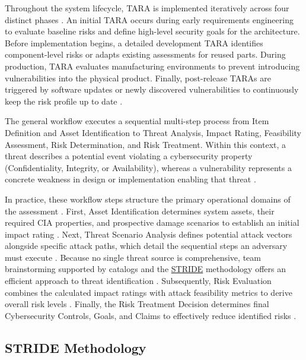 Throughout the system lifecycle, TARA is implemented iteratively across four distinct phases \cite[p. 40]{doCarmo2025}. An initial TARA occurs during early requirements engineering to evaluate baseline risks and define high-level security goals for the architecture. Before implementation begins, a detailed development TARA identifies component-level risks or adapts existing assessments for reused parts. During production, TARA evaluates manufacturing environments to prevent introducing vulnerabilities into the physical product. Finally, post-release TARAs are triggered by software updates or newly discovered vulnerabilities to continuously keep the risk profile up to date \cite[p. 40]{doCarmo2025}.

The general workflow executes a sequential multi-step process from Item Definition and Asset Identification to Threat Analysis, Impact Rating, Feasibility Assessment, Risk Determination, and Risk Treatment. Within this context, a threat describes a potential event violating a cybersecurity property (Confidentiality, Integrity, or Availability), whereas a vulnerability represents a concrete weakness in design or implementation enabling that threat \cite{microtool_tara_2026}.

In practice, these workflow steps structure the primary operational domains of the assessment \cite[p. 47, 49]{doCarmo2025}. First, Asset Identification determines system assets, their required CIA properties, and prospective damage scenarios to establish an initial impact rating \cite[p. 46, 49]{doCarmo2025}\cite{microtool_tara_2026}. Next, Threat Scenario Analysis defines potential attack vectors alongside specific attack paths, which detail the sequential steps an adversary must execute \cite[p. 46]{doCarmo2025}\cite{microtool_tara_2026}. Because no single threat source is comprehensive, team brainstorming supported by catalogs and the \hyperref[subsec:stride]{STRIDE} methodology offers an efficient approach to threat identification \cite[p. 135, 137]{doCarmo2025}. Subsequently, Risk Evaluation combines the calculated impact ratings with attack feasibility metrics to derive overall risk levels \cite[p. 47, 49]{doCarmo2025}\cite{microtool_tara_2026}. Finally, the Risk Treatment Decision determines final Cybersecurity Controls, Goals, and Claims to effectively reduce identified risks \cite[p. 37, 49]{doCarmo2025}\cite{microtool_tara_2026}.


\subsection{STRIDE Methodology} 
\label{subsec:stride} 

